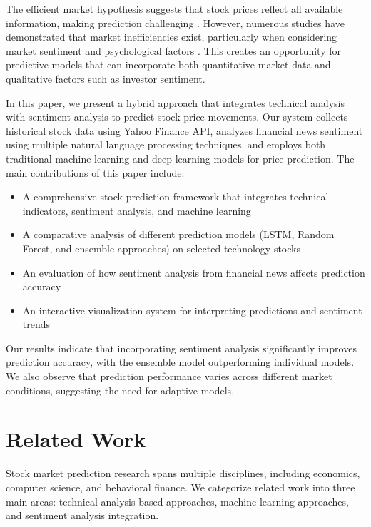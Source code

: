 \documentclass[review]{elsarticle}
\begin{document}
The efficient market hypothesis suggests that stock prices reflect all available information, making prediction challenging \citep{Fama1970}. However, numerous studies have demonstrated that market inefficiencies exist, particularly when considering market sentiment and psychological factors \citep{Tetlock2007}. This creates an opportunity for predictive models that can incorporate both quantitative market data and qualitative factors such as investor sentiment.

In this paper, we present a hybrid approach that integrates technical analysis with sentiment analysis to predict stock price movements. Our system collects historical stock data using Yahoo Finance API, analyzes financial news sentiment using multiple natural language processing techniques, and employs both traditional machine learning and deep learning models for price prediction. The main contributions of this paper include:

\begin{itemize}
    \item A comprehensive stock prediction framework that integrates technical indicators, sentiment analysis, and machine learning
    \item A comparative analysis of different prediction models (LSTM, Random Forest, and ensemble approaches) on selected technology stocks
    \item An evaluation of how sentiment analysis from financial news affects prediction accuracy
    \item An interactive visualization system for interpreting predictions and sentiment trends
\end{itemize}

Our results indicate that incorporating sentiment analysis significantly improves prediction accuracy, with the ensemble model outperforming individual models. We also observe that prediction performance varies across different market conditions, suggesting the need for adaptive models.

\section{Related Work}
\label{related-work}

Stock market prediction research spans multiple disciplines, including economics, computer science, and behavioral finance. We categorize related work into three main areas: technical analysis-based approaches, machine learning approaches, and sentiment analysis integration.
\end{document}
